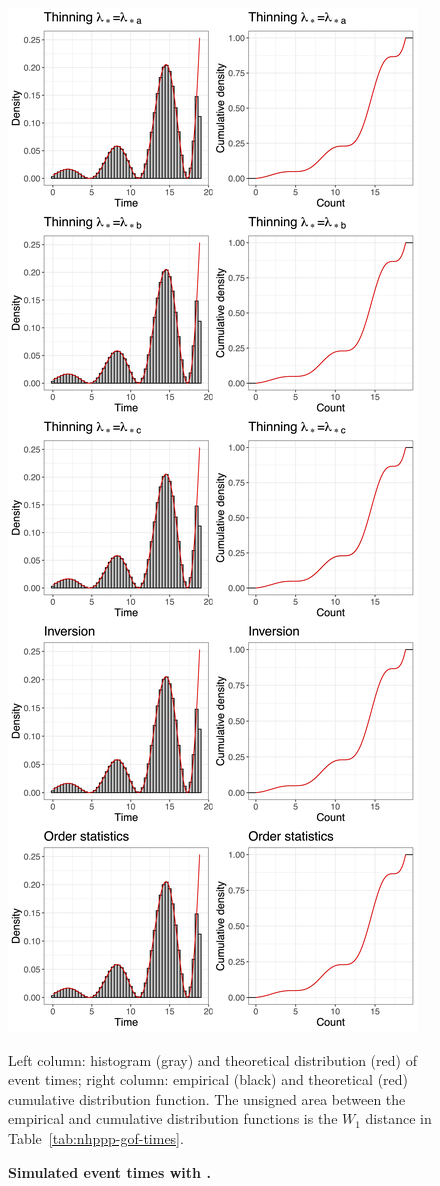 \documentclass[article,nojss]{jss}\usepackage[]{graphicx}\usepackage[]{xcolor}
\makeatletter
\def\maxwidth{ %
  \ifdim\Gin@nat@width>\linewidth
    \linewidth
  \else
    \Gin@nat@width
  \fi
}
\makeatother
\begin{document}
\newpage
\begin{figure}[H]
\caption{{\bf Simulated event times with .}}\label{fig:epdf-nhppp-pkg-times}
{\centering 
\includegraphics[width=\maxwidth,height=\textheight,keepaspectratio=true]{figure/epdf-nhppp-pkg-times-1.png} 
}
\begin{flushleft}
Left column: histogram (gray) and theoretical distribution (red) of event times; right column: empirical (black) and theoretical (red) cumulative distribution function. The unsigned area between the empirical and cumulative distribution functions is the $W_1$ distance in Table~\ref{tab:nhppp-gof-times}.
\end{flushleft}
\end{figure}
\end{document}
